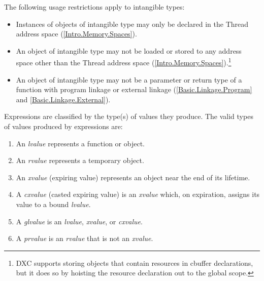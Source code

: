 \p The following usage restrictions apply to intangible types:
\begin{itemize}

\item Instances of objects of intangible type may only be declared in the Thread
address space (\ref{Intro.Memory.Spaces}).

\item An object of intangible type may not be loaded or stored to any address
space other than the Thread address space
(\ref{Intro.Memory.Spaces}).\footnote{DXC supports storing objects that contain
resources in cbuffer declarations, but it does so by hoisting the resource
declaration out to the global scope.}

\item An object of intangible type may not be a parameter or return type of a
function with program linkage or external linkage (\ref{Basic.Linkage.Program}
and \ref{Basic.Linkage.External}).
\end{itemize}


\p Expressions are classified by the type(s) of values they produce. The valid
types of values produced by expressions are:

\begin{enumerate}
  \item An \textit{lvalue} represents a function or object.
  \item An \textit{rvalue} represents a temporary object.
  \item An \textit{xvalue} (expiring value) represents an object near the end
  of its lifetime.
  \item A \textit{cxvalue} (casted expiring value) is an \textit{xvalue}
  which, on expiration, assigns its value to a bound \textit{lvalue}.
  \item A \textit{glvalue} is an \textit{lvalue}, \textit{xvalue}, or
  \textit{cxvalue}.
  \item A \textit{prvalue} is an \textit{rvalue} that is not an \textit{xvalue}.
\end{enumerate}

